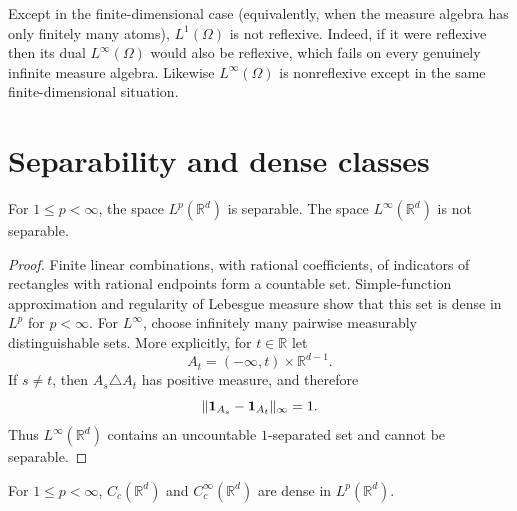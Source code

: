 \begin{noteremark}
Except in the finite-dimensional case (equivalently, when the measure algebra
has only finitely many atoms), $L^1(\Omega)$ is not reflexive.  Indeed, if it
were reflexive then its dual $L^\infty(\Omega)$ would also be reflexive, which
fails on every genuinely infinite measure algebra.  Likewise
$L^\infty(\Omega)$ is nonreflexive except in the same finite-dimensional
situation.
\end{noteremark}

\section{Separability and dense classes}

\begin{notetheorem}
For $1\le p<\infty$, the space $L^p(\mathbb R^d)$ is separable.  The space
$L^\infty(\mathbb R^d)$ is not separable.
\end{notetheorem}

\begin{proof}
Finite linear combinations, with rational coefficients, of indicators of
rectangles with rational endpoints form a countable set.  Simple-function
approximation and regularity of Lebesgue measure show that this set is dense in
$L^p$ for $p<\infty$.  For $L^\infty$, choose infinitely many pairwise
measurably distinguishable sets.  More explicitly, for $t\in\mathbb R$ let
\[
  A_t=(-\infty,t)\times\mathbb R^{d-1}.
\]
If $s\ne t$, then $A_s\triangle A_t$ has positive measure, and therefore
\[
  \|\mathbf{1}_{A_s}-\mathbf{1}_{A_t}\|_\infty=1.
\]
Thus $L^\infty(\mathbb R^d)$ contains an uncountable $1$-separated set and
cannot be separable.
\end{proof}

\begin{notetheorem}
For $1\le p<\infty$, $C_c(\mathbb R^d)$ and $C_c^\infty(\mathbb R^d)$ are
dense in $L^p(\mathbb R^d)$.
\end{notetheorem}

